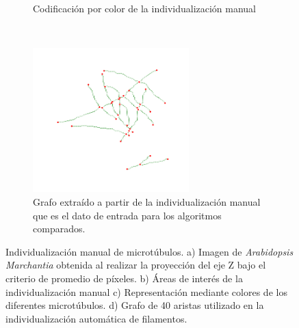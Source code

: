\begin{figure}[h!]
\begin{subfigure}[t]{0.49\textwidth}
        \caption{Codificaci\'on por color de la individualizaci\'on manual}
        \label{fig:field3t0filtered1-indivManual}
    \end{subfigure}
    ~
    \begin{subfigure}[t]{0.49\textwidth}
        \centering
        \includegraphics[height=2.2in]{benchImages/field3-t0-2cellBcrop-filtered-graph-thick.png}
        \caption{Grafo extra\'ido a partir de la individualizaci\'on manual que es el dato de entrada para los algoritmos comparados.}
        \label{fig:field3t0filtered1-graph}
    \end{subfigure}
    \caption{Individualizaci\'on manual de microt\'ubulos. a) Imagen de {\it Arabidopsis Marchantia} obtenida al realizar la proyecci\'on del eje Z bajo el criterio de promedio de p\'ixeles. b) \'Areas de inter\'es de la individualizaci\'on manual c) Representaci\'on mediante colores de los diferentes microt\'ubulos. d) Grafo de 40 aristas utilizado en la individualizaci\'on autom\'atica de filamentos.}
    \label{fig:field3t0filtered1}
\end{figure}



